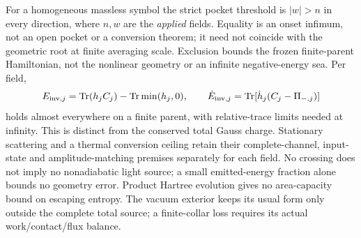 For a homogeneous massless symbol the strict pocket threshold is
$|w|>n$ in every direction, where $n,w$ are the \emph{applied} fields.
Equality is an onset infimum, not an open pocket or a conversion theorem;
it need not coincide with the geometric root at finite averaging scale.
Exclusion bounds the frozen finite-parent Hamiltonian, not the nonlinear
geometry or an infinite negative-energy sea. Per field,
\[
 E_{{\rm inv},j}=\operatorname{Tr}(h_jC_j)-\operatorname{Tr}\min(h_j,0),
 \qquad \dot E_{{\rm inv},j}
 =\operatorname{Tr}[\dot h_j(C_j-\Pi_{-,j})]
\]
holds almost everywhere on a finite parent, with relative-trace limits
needed at infinity. This is distinct from the conserved total Gauss charge.
Stationary scattering and a thermal conversion ceiling retain their
complete-channel, input-state and amplitude-matching premises separately
for each field. No crossing does not imply no nonadiabatic light source;
a small emitted-energy fraction alone bounds no geometry error. Product
Hartree evolution gives no area-capacity bound on escaping entropy.
The vacuum exterior keeps its usual form only outside the complete total
source; a finite-collar loss requires its actual work/contact/flux balance.

